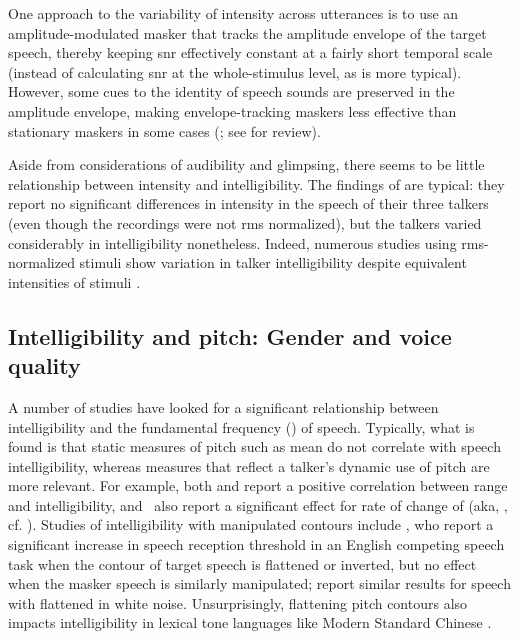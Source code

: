 One approach to the variability of intensity across utterances is to use an amplitude-modulated masker that tracks the amplitude envelope of the target speech, thereby keeping \ac{snr} effectively constant at a fairly short temporal scale (instead of calculating \ac{snr} at the whole-stimulus level, as is more typical).  However, some cues to the identity of speech sounds are preserved in the amplitude envelope, making envelope-tracking maskers less effective than stationary maskers in some cases (\citealp{HoriiEtAl1971, VanTasellEtAl1987, BashfordEtAl1996}; see \citealp{Wright2004b} for review).

Aside from considerations of audibility and glimpsing, there seems to be little relationship between intensity and intelligibility.  The findings of \citet{BondMoore1994} are typical: they report no significant differences in intensity in the speech of their three talkers (even though the recordings were not \ac{rms} normalized), but the talkers varied considerably in intelligibility nonetheless.  Indeed, numerous studies using \ac{rms}-normalized stimuli show variation in talker intelligibility despite equivalent intensities of stimuli \citep[is one example]{McCloyEtAl2013}.

\subsection[Intelligibility and pitch]{Intelligibility and pitch: Gender and voice quality\label{sec:IntelPitch}}
A number of studies have looked for a significant relationship between intelligibility and the fundamental frequency (\fo) of speech.  Typically, what is found is that static measures of pitch such as mean \fo{} do not correlate with speech intelligibility, whereas measures that reflect a talker’s dynamic use of pitch are more relevant.  For example, both \citet{BradlowEtAl1996} and \citet{McCloyEtAl2013} report a positive correlation between \fo{} range and intelligibility, and \citeauthor{McCloyEtAl2013}\ also report a significant effect for rate of change of \fo{} (\ac{aka}, , cf. \citealt{GauthierEtAl2007b, GauthierEtAl2007a, GauthierEtAl2009}).  Studies of intelligibility with manipulated \fo{} contours include \citet{BinnsCulling2007}, who report a significant increase in speech reception threshold in an English competing speech task when the \fo{} contour of target speech is flattened or inverted, but no effect when the masker speech is similarly manipulated; \citet{WatsonSchlauch2008} report similar results for speech with flattened \fo{} in white noise.  Unsurprisingly, flattening pitch contours also impacts intelligibility in lexical tone languages like Modern Standard Chinese \citep{PatelEtAl2010}.

